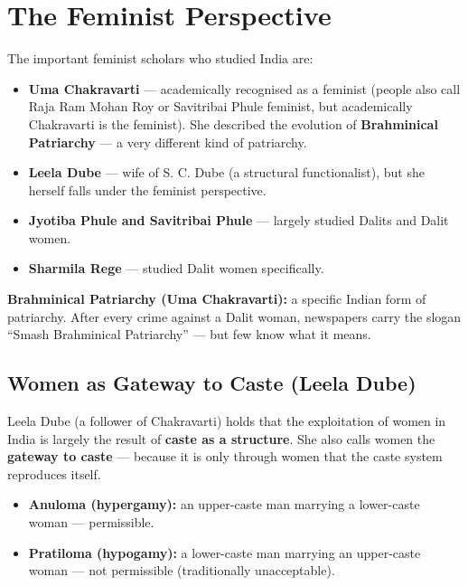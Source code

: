 \section{The Feminist Perspective}

The important feminist scholars who studied India are:
\begin{itemize}
\item \textbf{Uma Chakravarti} --- academically recognised as a feminist (people also call Raja Ram Mohan Roy or Savitribai Phule feminist, but academically Chakravarti is the feminist). She described the evolution of \textbf{Brahminical Patriarchy} --- a very different kind of patriarchy.
\item \textbf{Leela Dube} --- wife of S. C. Dube (a structural functionalist), but she herself falls under the feminist perspective.
\item \textbf{Jyotiba Phule and Savitribai Phule} --- largely studied Dalits and Dalit women.
\item \textbf{Sharmila Rege} --- studied Dalit women specifically.
\end{itemize}

\begin{KeyConcept}
\textbf{Brahminical Patriarchy (Uma Chakravarti):} a specific Indian form of patriarchy. After every crime against a Dalit woman, newspapers carry the slogan ``Smash Brahminical Patriarchy'' --- but few know what it means.
\end{KeyConcept}

\subsection{Women as Gateway to Caste (Leela Dube)}

Leela Dube (a follower of Chakravarti) holds that the exploitation of women in India is largely the result of \textbf{caste as a structure}. She also calls women the \textbf{gateway to caste} --- because it is only through women that the caste system reproduces itself.

\begin{ComparisonBox}
\begin{itemize}
\item \textbf{Anuloma (hypergamy):} an upper-caste man marrying a lower-caste woman --- permissible.
\item \textbf{Pratiloma (hypogamy):} a lower-caste man marrying an upper-caste woman --- not permissible (traditionally unacceptable).
\end{itemize}
\end{ComparisonBox}

